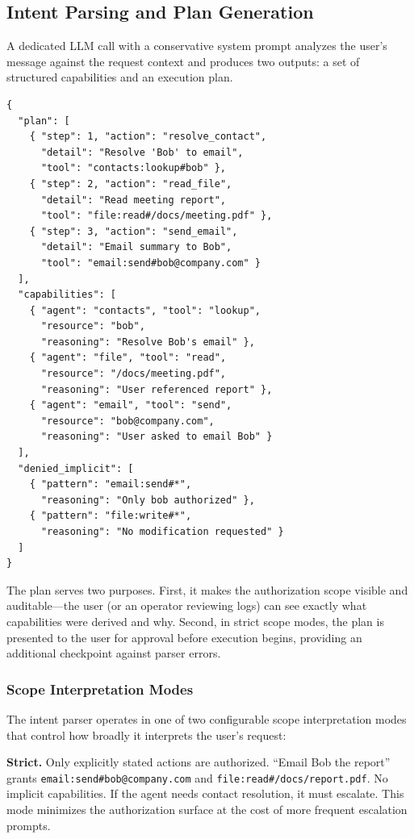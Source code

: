 \documentclass[11pt]{article}
\begin{document}
\subsection{Intent Parsing and Plan Generation}

A dedicated LLM call with a conservative system prompt analyzes the user's message against the request context and produces two outputs: a set of structured capabilities and an execution plan.

\begin{lstlisting}[language={}]
{
  "plan": [
    { "step": 1, "action": "resolve_contact",
      "detail": "Resolve 'Bob' to email",
      "tool": "contacts:lookup#bob" },
    { "step": 2, "action": "read_file",
      "detail": "Read meeting report",
      "tool": "file:read#/docs/meeting.pdf" },
    { "step": 3, "action": "send_email",
      "detail": "Email summary to Bob",
      "tool": "email:send#bob@company.com" }
  ],
  "capabilities": [
    { "agent": "contacts", "tool": "lookup",
      "resource": "bob",
      "reasoning": "Resolve Bob's email" },
    { "agent": "file", "tool": "read",
      "resource": "/docs/meeting.pdf",
      "reasoning": "User referenced report" },
    { "agent": "email", "tool": "send",
      "resource": "bob@company.com",
      "reasoning": "User asked to email Bob" }
  ],
  "denied_implicit": [
    { "pattern": "email:send#*",
      "reasoning": "Only bob authorized" },
    { "pattern": "file:write#*",
      "reasoning": "No modification requested" }
  ]
}
\end{lstlisting}

The plan serves two purposes. First, it makes the authorization scope visible and auditable---the user (or an operator reviewing logs) can see exactly what capabilities were derived and why. Second, in strict scope modes, the plan is presented to the user for approval before execution begins, providing an additional checkpoint against parser errors.

\subsubsection{Scope Interpretation Modes}

The intent parser operates in one of two configurable scope interpretation modes that control how broadly it interprets the user's request:

\textbf{Strict.} Only explicitly stated actions are authorized. ``Email Bob the report'' grants \texttt{email:send\#bob@company.com} and \texttt{file:read\#/docs/report.pdf}. No implicit capabilities. If the agent needs contact resolution, it must escalate. This mode minimizes the authorization surface at the cost of more frequent escalation prompts.
\end{document}

